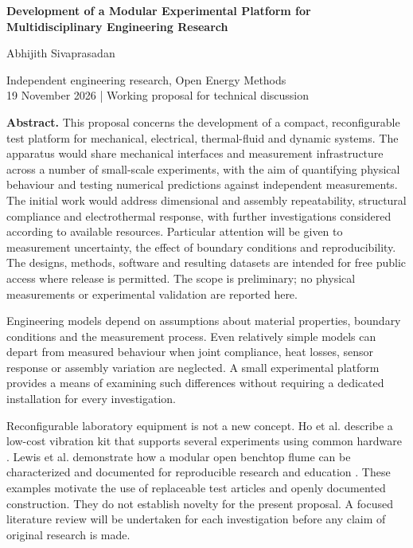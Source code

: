 \documentclass[11pt,a4paper]{article}
\makeatletter
\renewcommand\section{\@startsection{section}{1}{\z@}{10pt plus 2pt minus 2pt}{4pt}{\normalfont\large\bfseries}}
\makeatother
\begin{document}
\begin{center}
{\LARGE\bfseries Development of a Modular Experimental Platform for Multidisciplinary Engineering Research\par}
\vspace{8pt}
{\large Abhijith Sivaprasadan\par}
Independent engineering research, Open Energy Methods\\
19 November 2026 \quad | \quad Working proposal for technical discussion
\end{center}
\vspace{3pt}
\noindent\textbf{Abstract.} This proposal concerns the development of a compact, reconfigurable test platform for mechanical, electrical, thermal-fluid and dynamic systems. The apparatus would share mechanical interfaces and measurement infrastructure across a number of small-scale experiments, with the aim of quantifying physical behaviour and testing numerical predictions against independent measurements. The initial work would address dimensional and assembly repeatability, structural compliance and electrothermal response, with further investigations considered according to available resources. Particular attention will be given to measurement uncertainty, the effect of boundary conditions and reproducibility. The designs, methods, software and resulting datasets are intended for free public access where release is permitted. The scope is preliminary; no physical measurements or experimental validation are reported here.

\section{Introduction}
Engineering models depend on assumptions about material properties, boundary conditions and the measurement process. Even relatively simple models can depart from measured behaviour when joint compliance, heat losses, sensor response or assembly variation are neglected. A small experimental platform provides a means of examining such differences without requiring a dedicated installation for every investigation.

Reconfigurable laboratory equipment is not a new concept. Ho et al. describe a low-cost vibration kit that supports several experiments using common hardware \cite{ho}. Lewis et al. demonstrate how a modular open benchtop flume can be characterized and documented for reproducible research and education \cite{lewis}. These examples motivate the use of replaceable test articles and openly documented construction. They do not establish novelty for the present proposal. A focused literature review will be undertaken for each investigation before any claim of original research is made.
\end{document}
